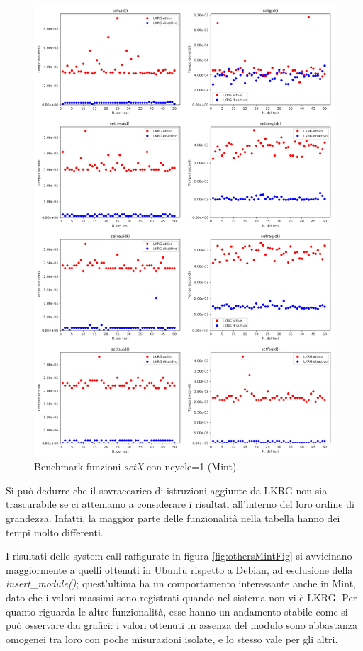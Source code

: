 \begin{figure}[!ht]
\centering
\includegraphics[scale=1.35]{Figures/Mint/SingleSet}
\caption[Benchmark funzioni \emph{setX} con ncycle=1 (Mint)]{Benchmark funzioni \emph{setX} con ncycle=1 (Mint).}
\label{fig:setxMintFig}
\end{figure}

Si può dedurre che il sovraccarico di istruzioni aggiunte da LKRG non sia trascurabile se ci atteniamo a considerare i risultati all'interno del loro ordine di grandezza. Infatti, la maggior parte delle funzionalità nella tabella hanno dei tempi molto differenti.


I risultati delle system call raffigurate in figura \autoref{fig:othersMintFig} si avvicinano maggiormente a quelli ottenuti in Ubuntu rispetto a Debian, ad esclusione della \emph{insert\_module()}; quest'ultima ha un comportamento interessante anche in Mint, dato che i valori massimi sono registrati quando nel sistema non vi è LKRG. Per quanto riguarda le altre funzionalità, esse hanno un andamento stabile come si può osservare dai grafici: i valori ottenuti in assenza del modulo sono abbastanza omogenei tra loro con poche misurazioni isolate, e lo stesso vale per gli altri.

